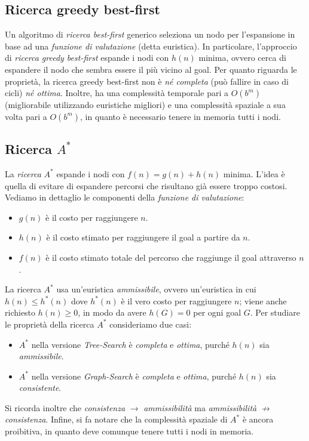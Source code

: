 \documentclass[11pt,oneside]{book}
\begin{document}
\subsection{Ricerca greedy best-first}
Un algoritmo di \textit{ricerca best-first} generico seleziona un nodo per l'espansione in base ad una \textit{funzione di valutazione} (detta euristica). In particolare, l'approccio di \textit{ricerca greedy best-first} espande i nodi con $h(n)$ minima, ovvero cerca di espandere il nodo che sembra essere il più vicino al goal. Per quanto riguarda le proprietà, la ricerca greedy best-first non è \textit{né completa} (può fallire in caso di cicli) \textit{né ottima}. Inoltre, ha una complessità temporale pari a $O(b^m)$ (migliorabile utilizzando euristiche migliori) e una complessità spaziale a sua volta pari a $O(b^m)$, in quanto è necessario tenere in memoria tutti i nodi.

\subsection{Ricerca \texorpdfstring{$A^\ast$}{A-star}}
La \textit{ricerca} $A^\ast$ espande i nodi con $f(n) = g(n) + h(n)$ minima. L'idea è quella di evitare di espandere percorsi che risultano già essere troppo costosi. Vediamo in dettaglio le componenti della \textit{funzione di valutazione}:
\begin{itemize}
	\item $g(n)$ è il costo per raggiungere $n$.
	\item $h(n)$ è il costo stimato per raggiungere il goal a partire da $n$.
	\item $f(n)$ è il costo stimato totale del percorso che raggiunge il goal attraverso $n$.
\end{itemize}
La ricerca $A^\ast$ usa un'euristica \textit{ammissibile}, ovvero un'euristica in cui $h(n) \leq h^\ast(n)$ dove $h^\ast(n)$ è il vero costo per raggiungere $n$; viene anche richiesto $h(n) \geq 0$, in modo da avere $h(G) = 0$ per ogni goal $G$. Per studiare le proprietà della ricerca $A^\ast$ consideriamo due casi:
\begin{itemize}
    \item $A^\ast$ nella versione \textit{Tree-Search} è \textit{completa} e \textit{ottima}, purché $h(n)$ sia \textit{ammissibile}.
    \item $A^\ast$ nella versione \textit{Graph-Search} è \textit{completa} e \textit{ottima}, purché $h(n)$ sia \textit{consistente}.
\end{itemize}
Si ricorda inoltre che \textit{consistenza} $\rightarrow$ \textit{ammissibilità} ma \textit{ammissibilità} $\not \rightarrow$ \textit{consistenza}. Infine, si fa notare che la complessità spaziale di $A^\ast$ è ancora proibitiva, in quanto deve comunque tenere tutti i nodi in memoria.
\end{document}
